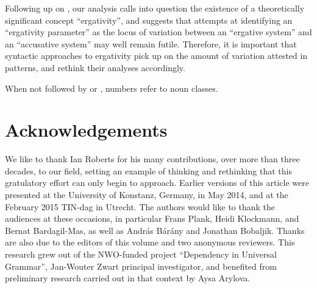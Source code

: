 \documentclass[output=paper]{langsci/langscibook}
\begin{document}
Following up on \citet{DeLancey2004}, our analysis calls into question the
existence of a theoretically significant concept \enquote{ergativity}, and
suggests that attempts at identifying an \enquote{ergativity parameter} as the
locus of variation between an \enquote{ergative system} and an
\enquote{accusative system} may well remain futile. Therefore, it is important
that syntactic approaches to ergativity pick up on the amount of variation
attested in  patterns, and rethink their analyses accordingly.

\printchapterglossary

When not followed by \Sg{} or \Pl{}, numbers refer to noun classes.

\section*{Acknowledgements}

We like to thank Ian Roberts for his many contributions, over more than three
decades, to our field, setting an example of thinking and rethinking that this
gratulatory effort can only begin to approach. Earlier versions of this article
were presented at the University of Konstanz, Germany, in May 2014, and at the
February 2015 TIN-dag in Utrecht. The authors would like to thank the audiences
at these occasions, in particular Frans Plank, Heidi Klockmann, and Bernat
Bardagil-Mas, as well as András Bárány and Jonathan Bobaljik. Thanks are also
due to the editors of this volume and two anonymous reviewers. This research
grew out of the NWO-funded project \enquote{Dependency in Universal Grammar},
Jan-Wouter Zwart principal investigator, and benefited from preliminary
research carried out in that context by Aysa Arylova.

{\sloppy\printbibliography[heading=subbibliography,notkeyword=this]}
\end{document}
